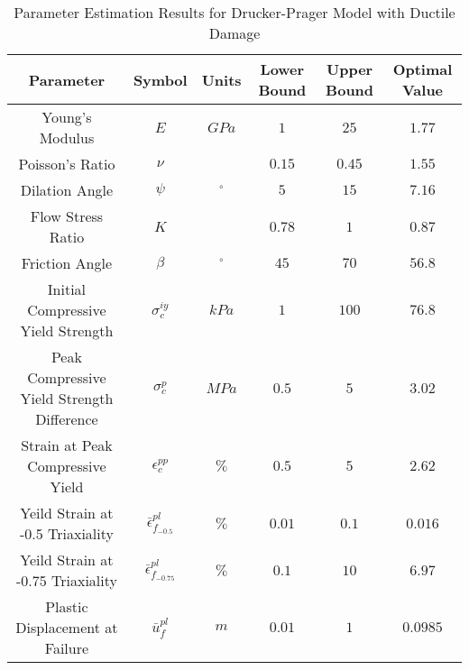 \begin{table}[]
\centering
\caption{Parameter Estimation Results for Drucker-Prager Model with Ductile Damage}
\label{tab:paramDrucker}
\begin{tabular}{@{}cccccc@{}}
\toprule
Parameter                                  & Symbol                            & Units      & Lower Bound & Upper Bound & Optimal Value \\ \midrule
Young's Modulus                            & $E$                               & $GPa$      & $1$         & $25$        & $1.77$        \\
Poisson's Ratio                            & $\nu$                             &            & $0.15$      & $0.45$      & $1.55$        \\
Dilation Angle                             & $\psi$                            & $^{\circ}$ & $5$         & $15$        & $7.16$        \\
Flow Stress Ratio                          & $K$                               &            & $0.78$      & $1$         & $0.87$        \\
Friction Angle                             & $\beta$                           & $^{\circ}$ & $45$        & $70$        & $56.8$        \\
Initial Compressive Yield Strength         & $\sigma_c^{iy}$                   & $kPa$      & $1$         & $100$       & $76.8$        \\
Peak Compressive Yield Strength Difference & $\sigma_c^{p}$                    & $MPa$      & $0.5$       & $5$         & $3.02$        \\
Strain at Peak Compressive Yield           & $\epsilon_c^{pp}$                 & $\%$       & $0.5$       & $5$         & $2.62$        \\
Yeild Strain at -0.5 Triaxiality           & $\bar{\epsilon}^{pl}_{f_{-0.5}}$  & $\%$       & $0.01$      & $0.1$       & $0.016$       \\
Yeild Strain at -0.75 Triaxiality          & $\bar{\epsilon}^{pl}_{f_{-0.75}}$ & $\%$       & $0.1$       & $10$        & $6.97$        \\
Plastic Displacement at Failure            & $\bar{u}^{pl}_f$                  & $m$        & $0.01$      & $1$         & $0.0985$      \\ \bottomrule
\end{tabular}
\end{table}